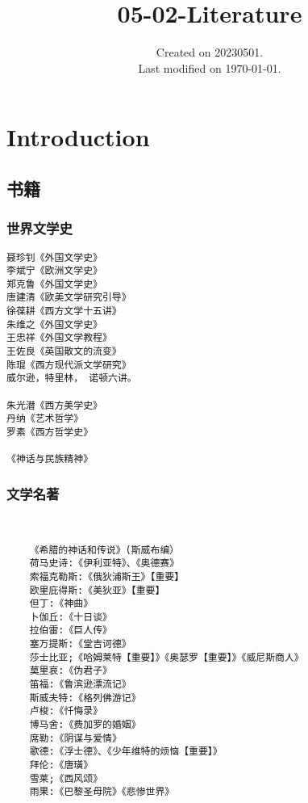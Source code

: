\documentclass[UTF8]{../RepresentationUniverse}
\begin{document}
\title{05-02-Literature}
\date{Created on 20230501.\\   Last modified on \today.}
\maketitle
\tableofcontents


\chapter{Introduction}


\section{书籍}





\subsection{世界文学史}

\begin{lstlisting}
聂珍钊《外国文学史》
李斌宁《欧洲文学史》
郑克鲁《外国文学史》
唐建清《欧美文学研究引导》
徐葆耕《西方文学十五讲》
朱维之《外国文学史》
王忠祥《外国文学教程》
王佐良《英国散文的流变》
陈琨《西方现代派文学研究》
威尔逊，特里林， 诺顿六讲。

朱光潜《西方美学史》
丹纳《艺术哲学》
罗素《西方哲学史》

《神话与民族精神》
\end{lstlisting}



\subsection{文学名著}


\begin{lstlisting}


    《希腊的神话和传说》(斯威布编）
    荷马史诗:《伊利亚特》、《奥德赛》
    索福克勒斯:《俄狄浦斯王》【重要】
    欧里庇得斯:《美狄亚》【重要】
    但丁:《神曲》
    卜伽丘:《十日谈》
    拉伯雷:《巨人传》
    塞万提斯:《堂吉诃德》
    莎士比亚;《哈姆莱特【重要】》《奥瑟罗【重要】》《威尼斯商人》
    莫里哀:《伪君子》
    笛福:《鲁滨逊漂流记》
    斯威夫特:《格列佛游记》
    卢梭:《忏悔录》
    博马舍:《费加罗的婚姻》
    席勒:《阴谋与爱情》
    歌德:《浮士德》、《少年维特的烦恼【重要】》
    拜伦:《唐璜》
    雪莱;《西风颂》
    雨果:《巴黎圣母院》《悲惨世界》



\end{lstlisting}
\end{document}
